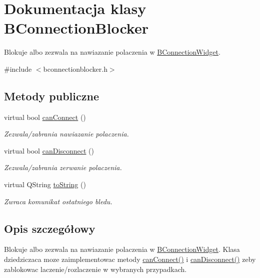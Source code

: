 \hypertarget{class_b_connection_blocker}{
\section{Dokumentacja klasy BConnectionBlocker}
\label{class_b_connection_blocker}
}


Blokuje albo zezwala na nawiazanie polaczenia w \hyperlink{class_b_connection_widget}{BConnectionWidget}.  




{\ttfamily \#include $<$bconnectionblocker.h$>$}

\subsection*{Metody publiczne}
\begin{DoxyCompactItemize}
\item 
virtual bool \hyperlink{class_b_connection_blocker_a2ebcdef0e5570c7331036dd5b6ba4448}{canConnect} ()
\begin{DoxyCompactList}\small\item\em Zezwala/zabrania nawiazanie polaczenia. \item\end{DoxyCompactList}\item 
virtual bool \hyperlink{class_b_connection_blocker_a81e8782c93ac1943a7e19b4ed7ced792}{canDisconnect} ()
\begin{DoxyCompactList}\small\item\em Zezwala/zabrania zerwanie polaczenia. \item\end{DoxyCompactList}\item 
\hypertarget{class_b_connection_blocker_adbf0d87dd3869926916e7bd956fbbc11}{
virtual QString \hyperlink{class_b_connection_blocker_adbf0d87dd3869926916e7bd956fbbc11}{toString} ()}
\label{class_b_connection_blocker_adbf0d87dd3869926916e7bd956fbbc11}

\begin{DoxyCompactList}\small\item\em Zwraca komunikat ostatniego bledu. \item\end{DoxyCompactList}\end{DoxyCompactItemize}


\subsection{Opis szczegółowy}
Blokuje albo zezwala na nawiazanie polaczenia w \hyperlink{class_b_connection_widget}{BConnectionWidget}. Klasa dziedziczaca moze zaimplementowac metody \hyperlink{class_b_connection_blocker_a2ebcdef0e5570c7331036dd5b6ba4448}{canConnect()} i \hyperlink{class_b_connection_blocker_a81e8782c93ac1943a7e19b4ed7ced792}{canDisconnect()} zeby zablokowac laczenie/rozlaczenie w wybranych przypadkach.

